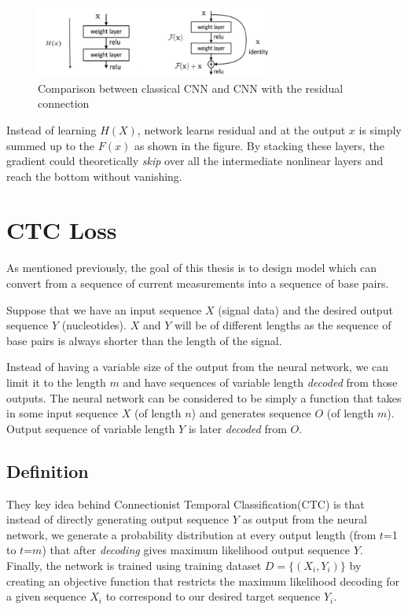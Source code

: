 \documentclass[times, utf8, diplomski, numeric, english]{fer}
\begin{document}
\begin{figure}[!ht]
	\begin{center}
		\includegraphics[width=0.7\textwidth]{./imgs/resnet_block.png}
		\caption[Comparison between classical CNN and CNN with the residual connection ]{Comparison between classical CNN and CNN with the residual connection \protect\footnotemark}
		\label{fg:resnet_block}
	\end{center}
\end{figure}
Instead of learning $H(X)$, network learns residual and at the output $x$ is simply summed up to the $F(x)$ as shown in the figure.  By stacking these layers, the gradient could theoretically \textit{skip} over all the intermediate nonlinear layers and reach the bottom without vanishing.




\section{CTC Loss}

As mentioned previously, the goal of this thesis is to design model which can convert from a sequence of current measurements into a sequence of base pairs.

Suppose that we have an input sequence $X$ (signal data) and the desired output sequence $Y$ (nucleotides). $X$ and $Y$ will be of different lengths as the sequence of base pairs is always shorter than the length of the signal.

Instead of having a variable size of the output from the neural network, we can limit it to the length $m$ and have sequences of variable length \textit{decoded} from those outputs. The neural network can be considered to be simply a function that takes in some input sequence $X$ (of length $n$) and generates sequence $O$ (of length $m$). Output sequence of variable length $Y$ is later \textit{decoded} from $O$.

\subsection{Definition}
They key idea behind Connectionist Temporal Classification(CTC) \cite{Graves:2006:CTC:1143844.1143891} is that instead of directly generating output sequence $Y$ as output from the neural network, we  generate a probability distribution at every output length (from $t$=1 to $t$=$m$) that after \textit{decoding} gives maximum likelihood output sequence $Y$. 
Finally, the network is trained using training dataset $D = \{(X_i, Y_i)\}$ by creating an objective function that restricts the maximum likelihood decoding for a given sequence $X_i$ to correspond to our desired target sequence $Y_i$.
\end{document}

